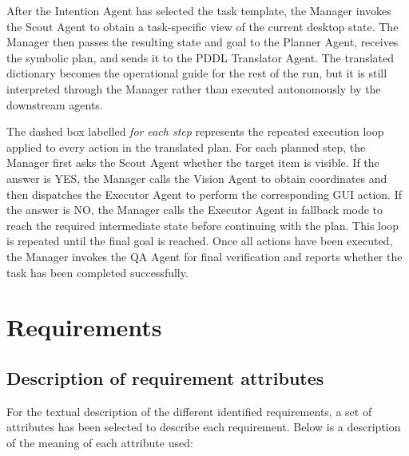 After the Intention Agent has selected the task template, the Manager invokes the Scout Agent to obtain a task-specific view of the current desktop state. The Manager then passes the resulting state and goal to the Planner Agent, receives the symbolic plan, and sends it to the PDDL Translator Agent. The translated dictionary becomes the operational guide for the rest of the run, but it is still interpreted through the Manager rather than executed autonomously by the downstream agents.

The dashed box labelled \textit{for each step} represents the repeated execution loop applied to every action in the translated plan. For each planned step, the Manager first asks the Scout Agent whether the target item is visible. If the answer is YES, the Manager calls the Vision Agent to obtain coordinates and then dispatches the Executor Agent to perform the corresponding GUI action. If the answer is NO, the Manager calls the Executor Agent in fallback mode to reach the required intermediate state before continuing with the plan. This loop is repeated until the final goal is reached. Once all actions have been executed, the Manager invokes the QA Agent for final verification and reports whether the task has been completed successfully.

\section{Requirements}
\subsection{Description of requirement attributes}

For the textual description of the different identified requirements, a set of attributes has been selected to describe each requirement. Below is a description of the meaning of each attribute used:

